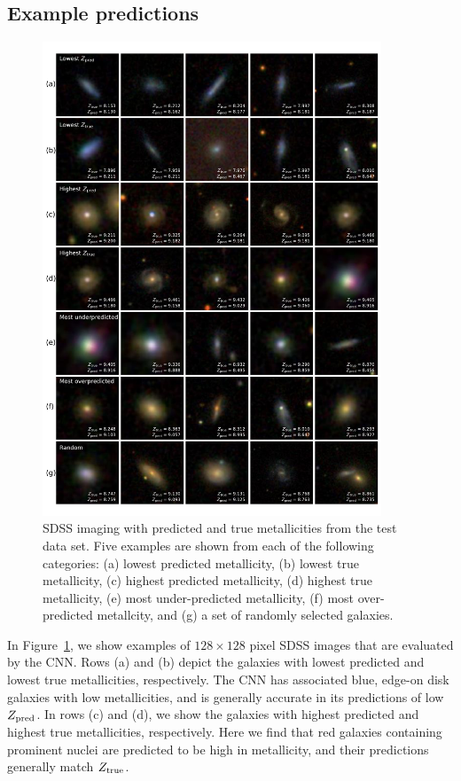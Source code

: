 \documentclass[fleqn,usenatbib]{mnras}
\begin{document}
\subsection{Example predictions}
\begin{figure}
	\includegraphics[width=0.9\textwidth]{01-prediction_examples.pdf}
	\caption{\label{fig:examples}
		SDSS imaging with predicted and true metallicities from the test data set. Five examples are shown from each of the following categories: (a) lowest predicted metallicity, (b) lowest true metallicity, (c) highest predicted metallicity, (d) highest true metallicity, (e) most under-predicted metallicity, (f) most over-predicted metallcity, and (g) a set of randomly selected galaxies.}
\end{figure}

In Figure~\ref{fig:examples}, we show examples of $128 \times 128$ pixel \sdssi\sdssr\sdssg{} SDSS images that are evaluated by the CNN. Rows (a) and (b) depict the galaxies with lowest predicted and lowest true metallicities, respectively. The CNN has associated blue, edge-on disk galaxies with low metallicities, and is generally accurate in its predictions of low $Z_{\rm pred}$. In rows (c) and (d), we show the galaxies with highest predicted and highest true metallicities, respectively. Here we find that red galaxies containing prominent nuclei are predicted to be high in metallicity, and their predictions generally match $Z_{\rm true}$.
\end{document}
